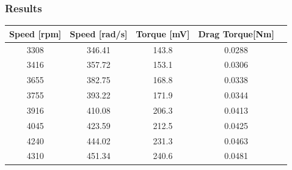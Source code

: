 \subsubsection{Results}
\begin{table}[H]
	\centering
	\begin{tabular}{|c|c|c|c|p{4.3cm}|}
		\hline%
		\textbf{Speed [rpm]}    & \textbf{Speed [rad/s]} & \textbf{Torque [mV]}  & \textbf{Drag Torque[Nm]} \\ 
		\hline%
		3308 						       &  346.41 				           & 143.8                 & 0.0288         \\
		\hline%
		3416                               &  357.72   			               & 153.1                 & 0.0306         \\
		\hline%
		3655                               &  382.75  			               & 168.8                 & 0.0338         \\
		\hline%
		3755                               &  393.22                           & 171.9                 & 0.0344         \\
		\hline%
		3916 						       &  410.08				           & 206.3                 & 0.0413         \\
		\hline%
		4045                               &  423.59    			           & 212.5                 & 0.0425         \\
		\hline%
		4240                               &  444.02                           & 231.3                 & 0.0463         \\
		\hline%
		4310 						       &  451.34			           & 240.6                 & 0.0481         \\
		\hline%
				
	\end{tabular}
\end{table}


